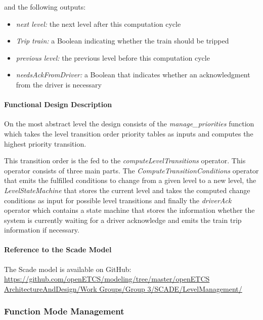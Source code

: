 and the following outputs:

\begin{itemize}
\item \emph{next level:} the next level after this computation cycle
\item \emph{Trip train:} a Boolean indicating whether the train should be
  tripped
\item \emph{previous level:} the previous level before this computation cycle
\item \emph{needsAckFromDriver:} a Boolean that indicates whether an
  acknowledgment from the driver is necessary
\end{itemize}

\paragraph{Functional Design Description}

On the most abstract level the design consists of the \emph{manage\_priorities} function which takes the level transition order priority tables as inputs and computes the highest priority transition.

This transition order is the fed to the \emph{computeLevelTransitions} operator. This operator consists of three main parts. The \emph{ComputeTransitionConditions} operator that emits the fulfilled conditions to change from a given level to a new level, the \emph{LevelStateMachine} that stores the current level and takes the computed change conditions as input for possible level transitions and finally the \emph{driverAck} operator which contains a state machine that stores the information whether the system is currently waiting for a driver acknowledge and emits the train trip information if necessary.


\paragraph{Reference to the Scade Model}

The Scade model is available on GitHub:
\url{https://github.com/openETCS/modeling/tree/master/openETCS ArchitectureAndDesign/Work Groups/Group 3/SCADE/LevelManagement/}


\subsubsection{Function Mode Management}%
